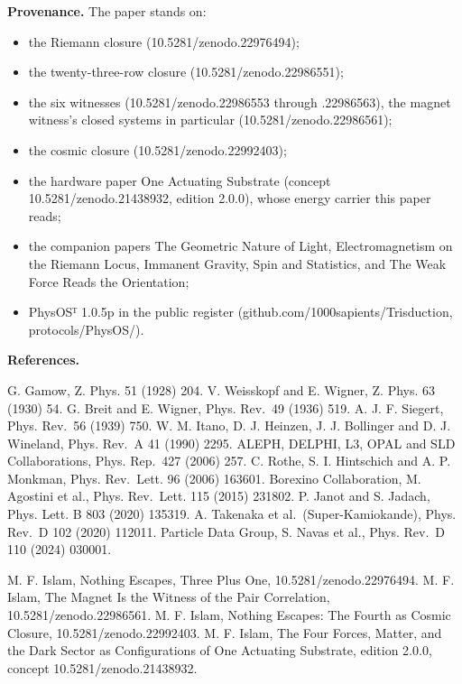 \documentclass[10pt]{article}
\providecommand{\tightlist}{\setlength{\itemsep}{0pt}\setlength{\parskip}{0pt}}
\begin{document}
\sloppy

\textbf{Provenance.} The paper stands on:

\begin{itemize}
\tightlist
\item
  the Riemann closure (10.5281/\allowbreak{}zenodo.22976494);
\item
  the twenty-three-row closure (10.5281/\allowbreak{}zenodo.22986551);
\item
  the six witnesses (10.5281/\allowbreak{}zenodo.22986553 through
  .22986563), the magnet witness's closed systems in particular
  (10.5281/\allowbreak{}zenodo.22986561);
\item
  the cosmic closure (10.5281/\allowbreak{}zenodo.22992403);
\item
  the hardware paper One Actuating Substrate (concept
  10.5281/\allowbreak{}zenodo.21438932, edition 2.0.0), whose energy
  carrier this paper reads;
\item
  the companion papers The Geometric Nature of Light, Electromagnetism
  on the Riemann Locus, Immanent Gravity, Spin and Statistics, and The
  Weak Force Reads the Orientation;
\item
  PhysOSᵀ 1.0.5p in the public register
  (github.com/\allowbreak{}1000sapients/\allowbreak{}Trisduction,
  protocols/PhysOS/).
\end{itemize}

\textbf{References.}

G. Gamow, Z. Phys. 51 (1928) 204. V. Weisskopf and E. Wigner, Z. Phys.
63 (1930) 54. G. Breit and E. Wigner, Phys. Rev.~49 (1936) 519. A. J. F.
Siegert, Phys. Rev.~56 (1939) 750. W. M. Itano, D. J. Heinzen, J. J.
Bollinger and D. J. Wineland, Phys. Rev.~A 41 (1990) 2295. ALEPH,
DELPHI, L3, OPAL and SLD Collaborations, Phys. Rep.~427 (2006) 257. C.
Rothe, S. I. Hintschich and A. P. Monkman, Phys. Rev.~Lett. 96 (2006)
163601. Borexino Collaboration, M. Agostini et al., Phys. Rev.~Lett. 115
(2015) 231802. P. Janot and S. Jadach, Phys. Lett. B 803 (2020) 135319.
A. Takenaka et al.~(Super-Kamiokande), Phys. Rev.~D 102 (2020) 112011.
Particle Data Group, S. Navas et al., Phys. Rev.~D 110 (2024) 030001.

M. F. Islam, Nothing Escapes, Three Plus One,
10.5281/\allowbreak{}zenodo.22976494. M. F. Islam, The Magnet Is the
Witness of the Pair Correlation, 10.5281/\allowbreak{}zenodo.22986561.
M. F. Islam, Nothing Escapes: The Fourth as Cosmic Closure,
10.5281/\allowbreak{}zenodo.22992403. M. F. Islam, The Four Forces,
Matter, and the Dark Sector as Configurations of One Actuating
Substrate, edition 2.0.0, concept 10.5281/\allowbreak{}zenodo.21438932.
\end{document}
